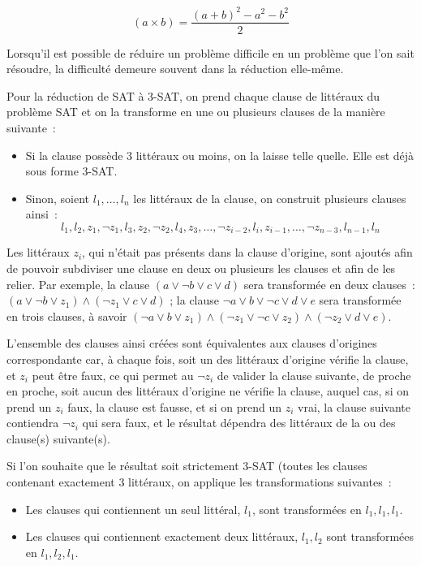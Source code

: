 \documentclass{article}
\begin{document}
$$(a \times b) = \dfrac{(a + b)^2 - a^2 - b^2}{2}$$


Lorsqu'il est possible de réduire un problème difficile en un problème que l'on sait résoudre, la difficulté demeure souvent dans la réduction elle-même.

Pour la réduction de SAT à 3-SAT, on prend chaque clause de littéraux du problème SAT et on la transforme en une ou plusieurs clauses de la manière suivante~:

\begin{itemize}
\item Si la clause possède 3 littéraux ou moins, on la laisse telle quelle. Elle est déjà sous forme 3-SAT.
\item Sinon, soient $l_1, \dots, l_n$ les littéraux de la clause, on construit plusieurs clauses ainsi~:
$$
{l_1, l_2, z_1}, {\lnot z_1, l_3, z_2}, {\lnot z_2, l_4, z_3}, \dots, {\lnot z_{i-2}, l_{i}, z_{i-1}}, \dots, {\lnot z_{n-3}, l_{n-1}, l_{n}}
$$
\end{itemize}

Les littéraux $z_i$, qui n'était pas présents dans la clause d'origine, sont ajoutés afin de pouvoir subdiviser une clause en deux ou
plusieurs les clauses et afin de les relier. Par exemple, la clause $(a \vee \lnot b \vee c \vee d)$ sera transformée en deux clauses~: $(a
\vee \lnot b \vee z_1) \wedge (\lnot z_1 \vee c \vee d)$ ; la clause ${\lnot a \vee b \vee \lnot c \vee d \vee e}$ sera transformée en trois
clauses, à savoir $(\lnot a \vee b \vee z_1) \wedge (\lnot z_1 \vee \lnot c \vee z_2) \wedge (\lnot z_2 \vee d \vee e)$.

L'ensemble des clauses ainsi créées sont équivalentes aux clauses d'origines correspondante car, à chaque fois, soit un des littéraux
d'origine vérifie la clause, et $z_i$ peut être faux, ce qui permet au $\lnot z_i$ de valider la clause suivante, de proche en proche, soit
aucun des littéraux d'origine ne vérifie la clause, auquel cas, si on prend un $z_i$ faux, la clause est fausse, et si on prend un $z_i$
vrai, la clause suivante contiendra $\lnot z_i$ qui sera faux, et le résultat dépendra des littéraux de la ou des clause(s) suivante(s).


Si l'on souhaite que le résultat soit strictement 3-SAT (toutes les clauses contenant exactement 3 littéraux, on applique les
transformations suivantes~:
\begin{itemize}
\item Les clauses qui contiennent un seul littéral, ${l_1}$, sont transformées en ${l_1, l_1, l_1}$.
\item Les clauses qui contiennent exactement deux littéraux, ${l_1, l_2}$ sont transformées en ${l_1, l_2, l_1}$.
\end{itemize}
\end{document}
